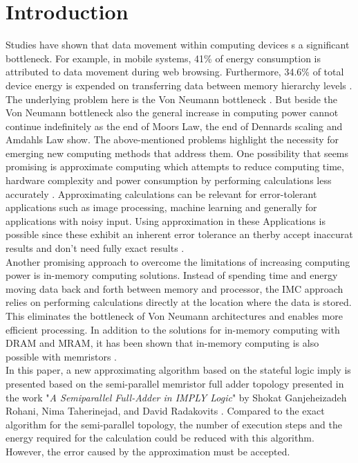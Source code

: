 \documentclass[]{IEEEtran}
\begin{document}
\section{Introduction}
Studies have shown that data movement within computing devices s a significant bottleneck. For example, in mobile systems, 41\% of energy consumption is attributed to data movement during web browsing. Furthermore, 34.6\% of total device energy is expended on transferring data between memory hierarchy levels \cite{6983056}. The underlying problem here is the Von Neumann bottleneck \cite{7878940}. 
But beside the Von Neumann bottleneck also the general increase in computing power cannot continue indefinitely as the end of Moors Law, the end of Dennards scaling and Amdahls Law show\cite{7878940, 6689270}. The above-mentioned problems highlight the necessity for emerging new computing methods that address them.
One possibility that seems promising is approximate computing which attempts to reduce computing time, hardware complexity and power consumption by performing calculations less accurately \cite{}.
Approximating calculations can be relevant for error-tolerant applications such as image processing, machine learning and generally for applications with noisy input. Using approximation in these Applications is possible since these exhibit an inherent error tolerance an therby accept inaccurat results and don't need fully exact results \cite{9024190}.\\
Another promising approach to overcome the limitations of increasing computing power is in-memory computing solutions. Instead of spending time and energy moving data back and forth between memory and processor, the IMC approach relies on performing calculations directly at the location where the data is stored. This eliminates the bottleneck of Von Neumann architectures and enables more efficient processing. In addition to the solutions for in-memory computing with DRAM and MRAM, it has been shown that in-memory computing is also possible with memristors \cite{sebastian-2020}.\\
In this paper, a new approximating algorithm based on the stateful logic \gls{imply} is presented based on the semi-parallel memristor full adder topology presented in the work "\textit{A Semiparallel Full-Adder in IMPLY Logic}" by Shokat Ganjeheizadeh Rohani, Nima Taherinejad, and David Radakovits \cite{8832255}. Compared to the exact algorithm for the semi-parallel topology, the number of execution steps and the energy required for the calculation could be reduced with this algorithm. However, the error caused by the approximation must be accepted.
\end{document}

